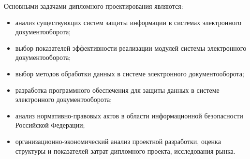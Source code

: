 \vspace{\baselineskip}
Основными задачами дипломного проектирования являются:
\begin{itemize}
	\item анализ существующих систем защиты информации в системах электронного документооборота;
	\item выбор показателей эффективности реализации модулей системы электронного документооборота;
	\item выбор методов обработки данных в системе электронного документооборота;
	\item разработка программного обеспечения для защиты данных в системе электронного документооборота;
	\item анализ нормативно-правовых актов в области информационной безопасности Российской Федерации;
	\item организационно-экономический анализ проектной разработки, оценка структуры и показателей затрат дипломного проекта, исследования рынка.
\end{itemize}

\clearpage